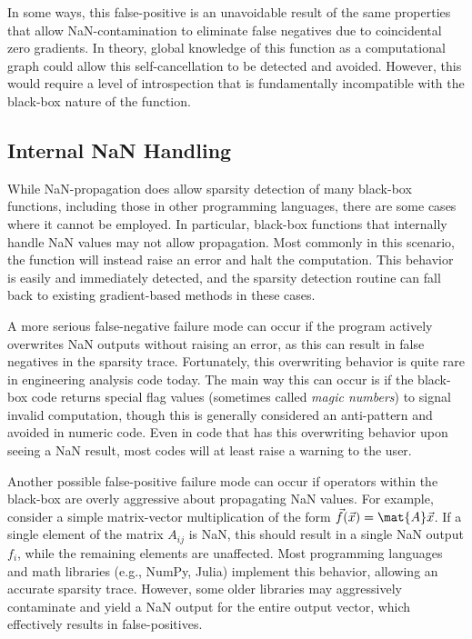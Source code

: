 \documentclass{article}
\begin{document}
In some ways, this false-positive is an unavoidable result of the same properties that allow NaN-contamination to eliminate false negatives due to coincidental zero gradients. In theory, global knowledge of this function as a computational graph could allow this self-cancellation to be detected and avoided. However, this would require a level of introspection that is fundamentally incompatible with the black-box nature of the function.

\subsection{Internal NaN Handling}

While NaN-propagation does allow sparsity detection of many black-box functions, including those in other programming languages, there are some cases where it cannot be employed. In particular, black-box functions that internally handle NaN values may not allow propagation. Most commonly in this scenario, the function will instead raise an error and halt the computation. This behavior is easily and immediately detected, and the sparsity detection routine can fall back to existing gradient-based methods in these cases.

A more serious false-negative failure mode can occur if the program actively overwrites NaN outputs without raising an error, as this can result in false negatives in the sparsity trace. Fortunately, this overwriting behavior is quite rare in engineering analysis code today. The main way this can occur is if the black-box code returns special flag values (sometimes called \emph{magic numbers}) to signal invalid computation, though this is generally considered an anti-pattern and avoided in numeric code. Even in code that has this overwriting behavior upon seeing a NaN result, most codes will at least raise a warning to the user.

Another possible false-positive failure mode can occur if operators within the black-box are overly aggressive about propagating NaN values. For example, consider a simple matrix-vector multiplication of the form $\vec{f}(\vec{x}) = \mat{A} \vec{x}$. If a single element of the matrix $A_{ij}$ is NaN, this should result in a single NaN output $f_i$, while the remaining elements are unaffected. Most programming languages and math libraries (e.g., NumPy, Julia) implement this behavior, allowing an accurate sparsity trace. However, some older libraries may aggressively contaminate and yield a NaN output for the entire output vector, which effectively results in false-positives.
\end{document}
